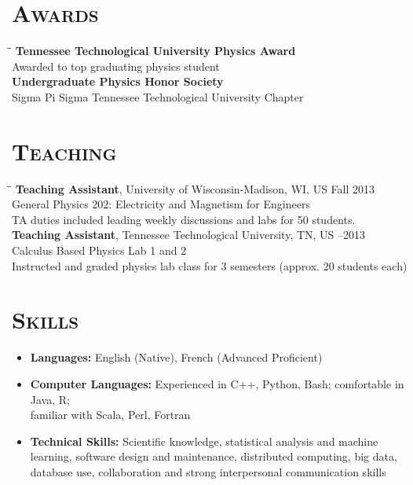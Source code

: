 \documentclass[10pt]{res} %
\begin{document}
\begin{resume}
\section{\textsc{Awards}}
\vspace{-0.1in}
\begin{tabbing}
\hspace{2.3in}\= \hspace{2.6in}\= \kill %
\textbf{Tennessee Technological University Physics Award} 				\>\>{Spring 2013 }\\
Awarded to top graduating physics student \\
\textbf{Undergraduate Physics Honor Society} \>\\
Sigma Pi Sigma Tennessee Technological University Chapter 	    \\
\end{tabbing}\vspace{-20pt}      %

\section{\textsc{Teaching}}
\vspace{-0.1in}

\begin{tabbing}
\hspace{3.5 in}\= \hspace{1.4in}\= \kill %
\textbf{Teaching Assistant}, University of Wisconsin-Madison, WI, US \>\> Fall 2013 \\
General Physics 202: Electricity and Magnetism for Engineers \\
TA duties included leading weekly discussions and labs for 50 students. \\
\textbf{Teaching Assistant}, Tennessee Technological University, TN, US \>--2013 \\
Calculus Based Physics Lab 1 and 2 \\
Instructed and graded physics lab class for 3 semesters (approx. 20 students each) \\
\end{tabbing}\vspace{-20pt}      %

\section{\textsc{Skills}}
\begin{itemize}
\item \textbf{Languages:} English (Native), French (Advanced Proficient)
\item \textbf{Computer Languages:} Experienced in C++, Python, Bash; comfortable in Java, R; \\ familiar with Scala, Perl, Fortran
\item \textbf{Technical Skills:} Scientific knowledge, statistical analysis and machine learning, software design and maintenance, distributed computing, big data, database use, collaboration and strong interpersonal communication skills
\end{itemize} 

\end{resume}
\end{document}
